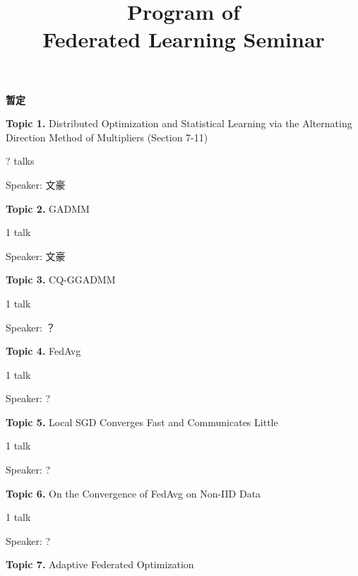 
\title{\Huge Program of \\ Federated Learning Seminar}
\author{}
\date{}

\maketitle

{\bfseries \large 暂定}

\vspace{2em}

{\bfseries \large Topic 1.} Distributed Optimization and Statistical Learning via the Alternating Direction Method of Multipliers (Section 7-11) \cite{boyd2011distributed}

? talks

Speaker: 文豪

\vspace{2em}

{\bfseries \large Topic 2.} GADMM \cite{elgabli2020gadmm}

1 talk

Speaker: 文豪

\vspace{2em}

{\bfseries \large Topic 3.} CQ-GGADMM \cite{issaid2020cq-ggadmm}

1 talk

Speaker: ？

\vspace{2em}

{\bfseries \large Topic 4.} FedAvg \cite{mcmahan2017fed_avg}

1 talk

Speaker: ?

\vspace{2em}

{\bfseries \large Topic 5.} Local SGD Converges Fast and Communicates Little \cite{stich2018local}

1 talk

Speaker: ?

\vspace{2em}

{\bfseries \large Topic 6.} On the Convergence of FedAvg on Non-IID Data \cite{li2019convergence}

1 talk

Speaker: ?

\vspace{2em}

{\bfseries \large Topic 7.} Adaptive Federated Optimization \cite{reddi2020fed_opt}

